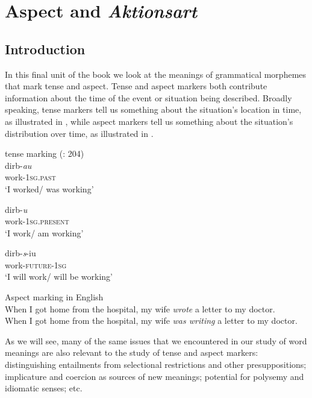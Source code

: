 
\chapter{Aspect and \textit{Aktionsart}}\label{sec:20}

\section{Introduction}\label{sec:20.1}

In this final unit of the book we look at the meanings of grammatical morphemes that mark tense and aspect. Tense and aspect markers both contribute information about the time of the event or situation being described. Broadly speaking, tense markers tell us something about the situation’s location in time, as illustrated in , while aspect markers tell us something about the situation’s distribution over time, as illustrated in . 

\ea \label{ex:20.1}
{ tense marking} (\citealt{ChungTimberlake1985}: 204)\\
\ea 
\gll dirb-\textit{au}\\
work-\textsc{1sg}\textsc{.past} \\
\glt ‘I worked/ was working’

\ex
\gll  dirb-\textit{u}\\
work-\textsc{1sg}\textsc{.present} \\
\glt ‘I work/ am working’

\ex
\gll dirb-\textit{s}-iu\\
work-\textsc{future-}\textsc{1sg} \\
\glt ‘I will work/ will be working’\\
\z
\z

\ea \label{ex:20.2}
{Aspect marking in English}\\
\ea  When I got home from the hospital, my wife \textit{wrote} a letter to my doctor.\\
\ex When I got home from the hospital, my wife \textit{was writing} a letter to my doctor.
                       \z
\z


As we will see, many of the same issues that we encountered in our study of word meanings are also relevant to the study of tense and aspect markers: distinguishing entailments from selectional restrictions and other presuppositions; implicature and coercion as sources of new meanings; potential for polysemy and idiomatic senses; etc.



